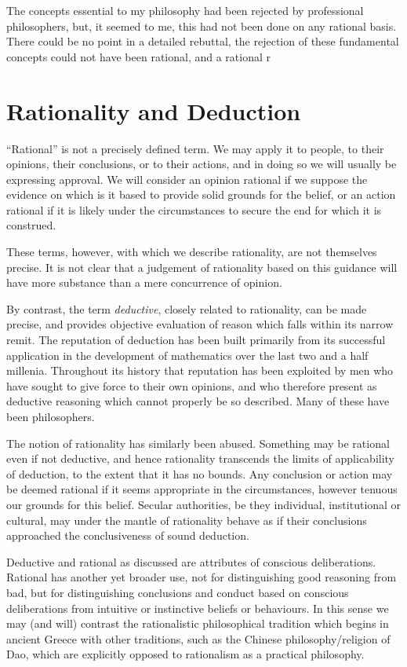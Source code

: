 The concepts essential to my philosophy had been rejected by professional philosophers, but, it seemed to me, this had not been done on any rational basis.
There could be no point in a detailed rebuttal, the rejection of these fundamental concepts could not have been rational, and a rational r

\chapter{Rationality and Deduction}\label{RationalityDeduction}

``Rational'' is not a precisely defined term.
We may apply it to people, to their opinions, their conclusions, or to their actions, and in doing so we will usually be expressing approval.
We will consider an opinion rational if we suppose the evidence on which is it based to provide solid grounds for the belief, or an action rational if it is likely under the circumstances to secure the end for which it is construed.

These terms, however, with which we describe rationality, are not themselves precise.
It is not clear that a judgement of rationality based on this guidance will have more substance than a mere concurrence of opinion.

By contrast, the term {\it deductive}, closely related to rationality, can be made precise, and provides objective evaluation of reason which falls within its narrow remit.
The reputation of deduction has been built primarily from its successful application in the development of mathematics over the last two and a half millenia.
Throughout its history that reputation has been exploited by men who have sought to give force to their own opinions, and who therefore present as deductive reasoning which cannot properly be so described.
Many of these have been philosophers.

The notion of rationality has similarly been abused.
Something may be rational even if not deductive, and hence rationality transcends the limits of applicability of deduction, to the extent that it has no bounds.
Any conclusion or action may be deemed rational if it seems appropriate in the circumstances, however tenuous our grounds for this belief.
Secular authorities, be they individual, institutional or cultural, may under the mantle of rationality behave as if their conclusions approached the conclusiveness of sound deduction.

Deductive and rational as discussed are attributes of conscious deliberations.
Rational has another yet broader use, not for distinguishing good reasoning from bad, but for distinguishing conclusions and conduct based on conscious deliberations from intuitive or instinctive beliefs or behaviours.
In this sense we may (and will) contrast the rationalistic philosophical tradition which begins in ancient Greece with other traditions, such as the Chinese philosophy/religion of Dao, which are explicitly opposed to rationalism as a practical philosophy.

